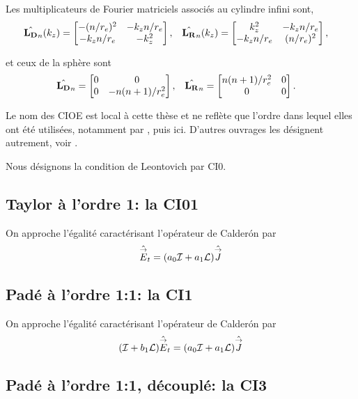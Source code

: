     Les multiplicateurs de Fourier matriciels associés au cylindre infini sont, 
    \begin{align*}
      \hat{\mathbf{L_D}}_n(k_z) &= \begin{bmatrix}-(n/r_e)^2 & -k_zn/r_e \\ -k_zn/r_e &-k_z^2\end{bmatrix},
      &
      \hat{\mathbf{L_R}}_n(k_z) &= \begin{bmatrix}k_z^2 & -k_zn/r_e \\ -k_zn/r_e & (n/r_e)^2\end{bmatrix},
    \end{align*}

    et ceux de la sphère sont
    \begin{align*}
      \hat{\mathbf{L_D}}_n &= \begin{bmatrix}0 & 0 \\ 0 &-n(n+1)/ r_e^2\end{bmatrix},
      &
      \hat{\mathbf{L_R}}_n &= \begin{bmatrix}n(n+1)/ r_e^2 &0 \\ 0 & 0\end{bmatrix}.
    \end{align*}

    Le nom des CIOE est local à cette thèse et ne reflète que l'ordre dans lequel elles ont été utilisées, notamment par \cite{stupfel_sufficient_2011}, puis ici.
    D'autres ouvrages les désignent autrement, voir \cite{hoppe_higher_1994,senior_approximate_1995,aubakirov_electromagnetic_2014}.
      
    Nous désignons la condition de Leontovich par CI0.

  \subsection{Taylor à l'ordre 1: la CI01}

    On approche l'égalité caractérisant l'opérateur de Calderón par
    \[
      \hat{{\overset{\rightarrow}{E}}}_t = ( a_0{\mathcal{I}} + a_1 \mathcal{L} ) \hat {{\overset{\rightarrow}{J}}}
    \]

  \subsection{Padé à l'ordre 1:1: la CI1}

    On approche l'égalité caractérisant l'opérateur de Calderón par
    \[
      ( {\mathcal{I}} + b_1 \mathcal{L} )\hat{{\overset{\rightarrow}{E}}}_t = ( a_0{\mathcal{I}} + a_1 \mathcal{L} ) \hat {{\overset{\rightarrow}{J}}}
    \]

  \subsection{Padé à l'ordre 1:1, découplé: la CI3}

